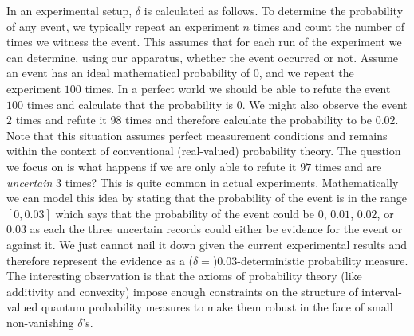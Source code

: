 \documentclass[english,reprint, aps, prl,superscriptaddress, showpacs,
showkeys, longbibliography, amsmath, amssymb, floatfix]{revtex4-1}
\theoremstyle{plain}
\theoremstyle{definition}
\begin{document}



In an experimental setup, $\delta$ is calculated as follows. To
determine the probability of any event, we typically repeat an
experiment $n$ times and count the number of times we witness the
event. This assumes that for each run of the experiment we can
determine, using our apparatus, whether the event occurred or
not. Assume an event has an ideal mathematical probability of $0$, and
we repeat the experiment $100$ times. In a perfect world we should be
able to refute the event $100$ times and calculate that the
probability is $0$. We might also observe the event $2$ times and
refute it $98$ times and therefore calculate the probability to be
$0.02$. Note that this situation assumes perfect measurement
conditions and remains within the context of conventional
(real-valued) probability theory. The question we focus on is what
happens if we are only able to refute it $97$ times and are
\emph{uncertain} $3$ times? This is quite common in actual
experiments. Mathematically we can model this idea by stating that the
probability of the event is in the range $\left[0,0.03\right]$ which
says that the probability of the event could be $0$, $0.01$, $0.02$,
or $0.03$ as each the three uncertain records could either be evidence
for the event or against it. We just cannot nail it down given the
current experimental results and therefore represent the evidence as a
($\delta=$)$0.03$-deterministic probability measure. The interesting
observation is that the axioms of probability theory (like additivity
and convexity) impose enough constraints on the structure of
interval-valued quantum probability measures to make them robust in
the face of small non-vanishing $\delta$'s.
\end{document}
